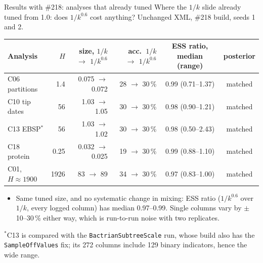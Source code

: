\documentclass[aspectratio=169,11pt]{beamer}
\begin{document}
\begin{frame}{Results with \#218: analyses that already tuned}
    Where the $1/k$ slide already tuned from 1.0: does $1/k^{0.6}$ cost anything?
  Unchanged XML, \#218 build, seeds 1 and 2.

  \vspace{0.4em}
  \centering\footnotesize
  \begin{tabular}{lrrrcc}
    \toprule
    Analysis & $H$ & size, $1/k$ $\to$ $1/k^{0.6}$ & acc.\ $1/k$ $\to$ $1/k^{0.6}$ & ESS ratio, median (range) & posterior \\
    \midrule
    C06 partitions & 1.4 & 0.075 $\to$ 0.072 & 28 $\to$ 30\,\% & 0.99 \;(0.71--1.37) & matched \\
    C10 tip dates & 56 & 1.03 $\to$ 1.05 & 30 $\to$ 30\,\% & 0.98 \;(0.90--1.21) & matched \\
    C13 EBSP$^\ast$ & 56 & 1.03 $\to$ 1.02 & 30 $\to$ 30\,\% & 0.98 \;(0.50--2.43) & matched \\
    C18 protein & 0.25 & 0.032 $\to$ 0.025 & 19 $\to$ 30\,\% & 0.99 \;(0.88--1.10) & matched \\
    C01, $H \approx 1900$ & \num{1926} & 83 $\to$ 89 & 34 $\to$ 30\,\% & 0.97 \;(0.83--1.00) & matched \\
    \bottomrule
  \end{tabular}

  \vspace{0.5em}
  \raggedright
  \begin{itemize}\small
    \item Same tuned size, and no systematic change in mixing: ESS ratio ($1/k^{0.6}$ over $1/k$, every
      logged column) has median 0.97--0.99. Single columns vary by $\pm$10--30\,\% either way, which is
      run-to-run noise with two replicates.
  \end{itemize}
  \vspace{-0.3em}
  {\scriptsize\color{ink2} $^\ast$C13 is compared with the \texttt{BactrianSubtreeScale} run, whose build also has the
  \texttt{SampleOffValues} fix; its 272 columns include 129 binary indicators, hence the wide range.}

\end{frame}
\end{document}

